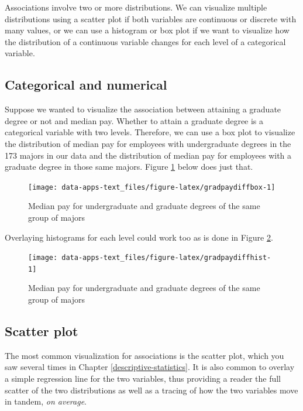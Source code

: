 \documentclass[
]{book}
\begin{document}
Associations involve two or more distributions. We can visualize multiple distributions using a scatter plot if both variables are continuous or discrete with many values, or we can use a histogram or box plot if we want to visualize how the distribution of a continuous variable changes for each level of a categorical variable.

\hypertarget{categorical-and-numerical}{%
\subsection{Categorical and numerical}\label{categorical-and-numerical}}

Suppose we wanted to visualize the association between attaining a graduate degree or not and median pay. Whether to attain a graduate degree is a categorical variable with two levels. Therefore, we can use a box plot to visualize the distribution of median pay for employees with undergraduate degrees in the 173 majors in our data and the distribution of median pay for employees with a graduate degree in those same majors. Figure \ref{fig:gradpaydiffbox} below does just that.

\begin{figure}

{\centering \texttt{[image: data-apps-text\_files/figure-latex/gradpaydiffbox-1]} 

}

\caption{Median pay for undergraduate and graduate degrees of the same group of majors}\label{fig:gradpaydiffbox}
\end{figure}

Overlaying histograms for each level could work too as is done in Figure \ref{fig:gradpaydiffhist}.

\begin{figure}

{\centering \texttt{[image: data-apps-text\_files/figure-latex/gradpaydiffhist-1]} 

}

\caption{Median pay for undergraduate and graduate degrees of the same group of majors}\label{fig:gradpaydiffhist}
\end{figure}

\hypertarget{scatter-plot}{%
\subsection{Scatter plot}\label{scatter-plot}}

The most common visualization for associations is the scatter plot, which you saw several times in Chapter \ref{descriptive-statistics}. It is also common to overlay a simple regression line for the two variables, thus providing a reader the full scatter of the two distributions as well as a tracing of how the two variables move in tandem, \emph{on average}.
\end{document}
